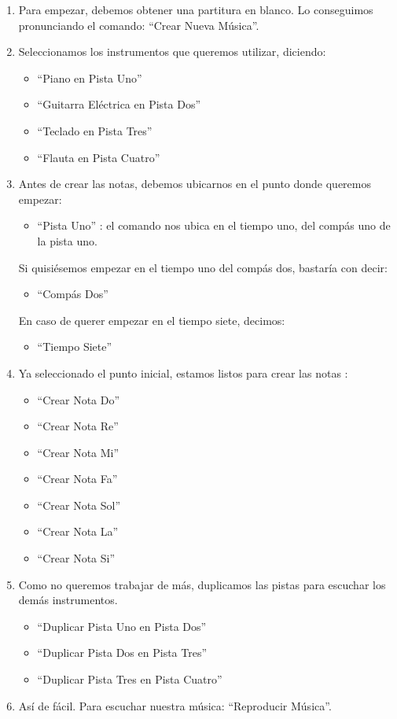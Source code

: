 \begin{enumerate}
\item Para empezar, debemos obtener una partitura en blanco. Lo conseguimos pronunciando el comando: ``Crear Nueva M\'usica''.
\item Seleccionamos los instrumentos que queremos utilizar, diciendo:
\begin{itemize}
    \item ``Piano en Pista Uno''
    \item ``Guitarra El\'ectrica en Pista Dos''
    \item ``Teclado en Pista Tres''
    \item ``Flauta en Pista Cuatro''
\end{itemize}
\item Antes de crear las notas, debemos ubicarnos en el punto donde queremos empezar:
\begin{itemize}
\item ``Pista Uno'' : el comando nos ubica en el tiempo uno, del comp\'as uno de la pista uno.
\end{itemize}
    Si quisi\'esemos empezar en el tiempo uno del comp\'as dos, bastar\'ia con decir:
\begin{itemize}
\item ``Comp\'as Dos''
\end{itemize}
    En caso de querer empezar en el tiempo siete, decimos:
\begin{itemize}
\item ``Tiempo Siete''
\end{itemize}
\item Ya seleccionado el punto inicial, estamos listos para crear las notas :
\begin{itemize}
    \item ``Crear Nota Do''
    \item ``Crear Nota Re''
    \item ``Crear Nota Mi''
    \item ``Crear Nota Fa''
    \item ``Crear Nota Sol''
    \item ``Crear Nota La''
    \item ``Crear Nota Si''
\end{itemize}
\item Como no queremos trabajar de m\'as, duplicamos las pistas para escuchar los dem\'as instrumentos.
\begin{itemize}
    \item ``Duplicar Pista Uno en Pista Dos''
    \item  ``Duplicar Pista Dos en Pista Tres''
    \item ``Duplicar Pista Tres en Pista Cuatro''
\end{itemize}
\item As\'i de f\'acil. Para escuchar nuestra m\'usica: ``Reproducir M\'usica''.
\end{enumerate}
 
